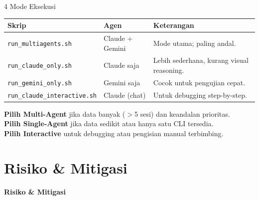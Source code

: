 \documentclass[aspectratio=169, table]{beamer}
\begin{document}
\begin{frame}{4 Mode Eksekusi}
\vspace{6pt}
\centering
\footnotesize
\begin{tabular}{|l|l|p{6.2cm}|}
\hline
\rowcolor{blue!12}
\textbf{Skrip} & \textbf{Agen} & \textbf{Keterangan} \\
\hline
\texttt{run\_multiagents.sh} & Claude + Gemini & Mode utama; paling andal. \\
\hline
\texttt{run\_claude\_only.sh} & Claude saja & Lebih sederhana, kurang visual reasoning. \\
\hline
\texttt{run\_gemini\_only.sh} & Gemini saja & Cocok untuk pengujian cepat. \\
\hline
\texttt{run\_claude\_interactive.sh} & Claude (chat) & Untuk debugging step-by-step. \\
\hline
\end{tabular}

\vspace{10pt}
\small
\textbf{Pilih Multi-Agent} jika data banyak ($>$5 sesi) dan keandalan prioritas.\\
\textbf{Pilih Single-Agent} jika data sedikit atau hanya satu CLI tersedia.\\
\textbf{Pilih Interactive} untuk debugging atau pengisian manual terbimbing.
\end{frame}

\section{Risiko \& Mitigasi}
\begin{frame}{\hfill}
	\centering
	\Huge{\textbf{Risiko \& Mitigasi}}
\end{frame}
\end{document}
